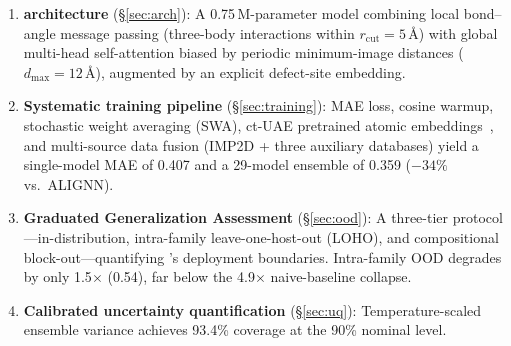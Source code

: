 \begin{enumerate}
  \item \textbf{\dart{} architecture} (\S\ref{sec:arch}):
    A 0.75\,M-parameter model combining local bond--angle message passing
    (three-body interactions within $r_\mathrm{cut}=5$\,\AA{}) with global
    multi-head self-attention biased by periodic minimum-image distances
    ($d_\mathrm{max}=12$\,\AA{}), augmented by an explicit defect-site
    embedding.

  \item \textbf{Systematic training pipeline} (\S\ref{sec:training}):
    MAE loss, cosine warmup, stochastic weight averaging (SWA), ct-UAE
    pretrained atomic embeddings~\cite{ctuae2025}, and multi-source data
    fusion (IMP2D + three auxiliary databases) yield a single-model MAE of
    0.407\eV{} and a 29-model ensemble of 0.359\eV{} ($-34\%$ vs.\ ALIGNN).

  \item \textbf{Graduated Generalization Assessment} (\S\ref{sec:ood}):
    A three-tier protocol---in-distribution, intra-family
    leave-one-host-out (LOHO), and compositional block-out---quantifying
    \dart{}'s deployment boundaries.
    Intra-family OOD degrades by only 1.5$\times$ (0.54\eV{}), far below
    the 4.9$\times$ naive-baseline collapse.

  \item \textbf{Calibrated uncertainty quantification}
    (\S\ref{sec:uq}):
    Temperature-scaled ensemble variance achieves 93.4\% coverage at the
    90\% nominal level.
\end{enumerate}
